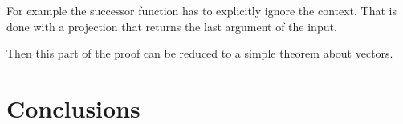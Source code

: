 \documentclass{jfp}
\begin{document}
For example the successor function has to explicitly ignore the context.
\sTtoPRSuc
That is done with a projection that returns the last argument of the input.
\sTtoPRSoundSuc

Then this part of the proof can be reduced to a simple theorem about vectors.
\lookupFromN


%




\section{Conclusions}
\label{sec:conclusions}




\label{lastpage01}
\end{document}
